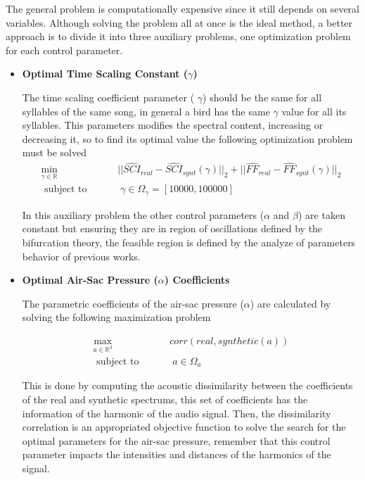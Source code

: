 The general problem is computationally expensive since it still depends on several variables. Although solving the problem all at once is the ideal method, a better approach is to divide it into three auxiliary problems, one optimization problem for each control parameter.

\begin{itemize}
\item  \textbf{Optimal Time Scaling Constant ($\gamma$)}

The time scaling coefficient parameter ( $\gamma$) should be the same for all syllables of the same song, in general a bird has the same $\gamma$ value for all its syllables. This parameters modifies the spectral content, increasing or decreasing it, so to find its optimal value the following optimization problem must be solved
\begin{equation}\label{eq_optimal_gamma}
\begin{aligned}
\underset{ \gamma \in \mathbb{R}}{\text{min}} &\qquad   || \hat{SCI}_{real} - \hat{SCI}_{synt} ( \gamma)||_2  + || \hat{FF}_{real} - \hat{FF}_{synt}(\gamma)||_2\\
    \text { subject to }  & \qquad  \;   \gamma \in \Omega_\gamma = [10000, 100000]
\end{aligned}
\end{equation}

In this auxiliary problem the other control parameters ($\alpha$ and $\beta$) are taken constant but ensuring they are in region of oscillations defined by the bifurcation theory, the feasible region is defined by the analyze of parameters behavior of previous works.

\item  \textbf{Optimal Air-Sac Pressure ($\alpha$) Coefficients}

The parametric coefficients of the air-sac pressure ($\alpha$) are calculated by solving the following maximization problem 

\begin{equation}\label{optimal_a_max}
\begin{aligned}
\underset{a \in \mathbb{R}^3}{\text{max}} &  \qquad corr (real, synthetic(a))  \\
    \text { subject to }  &  \qquad \;  a \in \Omega_a
\end{aligned}
\end{equation}

This is done by computing the acoustic dissimilarity between the coefficients of the real and synthetic spectrums, this set of coefficients has the information of the harmonic of the audio signal. Then, the dissimilarity correlation is an appropriated objective function to solve the search for the optimal parameters for the air-sac pressure, remember that this control parameter impacts the intensities and distances of the harmonics of the signal.\\


\end{itemize}
